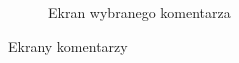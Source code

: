 \begin{figure}[ht]
\begin{subfigure}[t]{0.32\textwidth}
    \centering
    \caption{Ekran wybranego komentarza}
  \end{subfigure}
  \caption{Ekrany komentarzy}
  \label{fig:ratings}
\end{figure}
